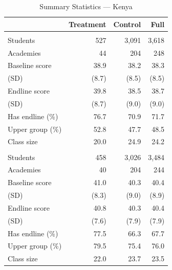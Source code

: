 \begin{table}[htbp]
\centering
\small
\caption{Summary Statistics --- Kenya}
\label{tab:ke_sumstats}
\begin{tabular}{l*{3}{r}}
\toprule
 & Treatment & Control & Full \\
\midrule
\addlinespace
\multicolumn{4}{l}{\textit{Grade 1}} \\
Students & 527 & 3,091 & 3,618 \\
Academies & 44 & 204 & 248 \\
Baseline score & 38.9 & 38.2 & 38.3 \\
\quad (SD) & (8.7) & (8.5) & (8.5) \\
Endline score & 39.8 & 38.5 & 38.7 \\
\quad (SD) & (8.7) & (9.0) & (9.0) \\
Has endline (\%) & 76.7 & 70.9 & 71.7 \\
Upper group (\%) & 52.8 & 47.7 & 48.5 \\
Class size & 20.0 & 24.9 & 24.2 \\
\addlinespace
\multicolumn{4}{l}{\textit{Grade 2}} \\
Students & 458 & 3,026 & 3,484 \\
Academies & 40 & 204 & 244 \\
Baseline score & 41.0 & 40.3 & 40.4 \\
\quad (SD) & (8.3) & (9.0) & (8.9) \\
Endline score & 40.8 & 40.3 & 40.4 \\
\quad (SD) & (7.6) & (7.9) & (7.9) \\
Has endline (\%) & 77.5 & 66.3 & 67.7 \\
Upper group (\%) & 79.5 & 75.4 & 76.0 \\
Class size & 22.0 & 23.7 & 23.5 \\
\bottomrule
\end{tabular}
\end{table}